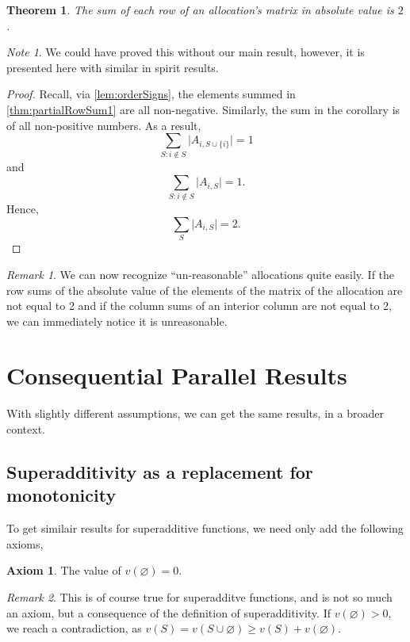 \documentclass[12pt,letterpaper,final]{article}
\theoremstyle{plain}
\newtheorem{theorem}{Theorem}[section]
\theoremstyle{plain}
\theoremstyle{plain}
\theoremstyle{plain}
\theoremstyle{plain}
\theoremstyle{plain}
\theoremstyle{plain}
\theoremstyle{definition}
\theoremstyle{definition}
\theoremstyle{definition}
\theoremstyle{definition}
\theoremstyle{definition}
\newtheorem{axiom}{Axiom}[section]
\theoremstyle{remark}
\newtheorem*{remark}{Remark}
\theoremstyle{remark}
\newtheorem*{note}{Note}
\theoremstyle{remark}
\theoremstyle{remark}
\begin{document}
\begin{theorem}
  The sum of each row of an allocation's matrix in absolute value is
  \(2\).
\end{theorem}

\begin{note}
  We could have proved this without our main result, however, it is
  presented here with similar in spirit results.
\end{note}

\begin{proof}
  Recall, via \cref{lem:orderSigns}, the elements summed in
  \cref{thm:partialRowSum1} are all non-negative. Similarly,
  the sum in the corollary is of all non-positive numbers. As a
  result,
  \[
    \sum_{S: i\notin S} \lvert A_{i,S \cup \{i\}} \rvert= 1
  \]
  and
  \[
    \sum_{S: i\notin S} \lvert A_{i,S} \rvert= 1.
  \]
  Hence,
  \[
    \sum_{S} \lvert A_{i,S}\rvert= 2.
  \]
\end{proof}

\begin{remark}
  We can now recognize ``un-reasonable'' allocations quite easily. If
  the row sums of the absolute value of the elements of the matrix
  of the allocation are not equal to 2 and if the column sums of an
  interior column
  are not equal to 2, we can immediately notice it is unreasonable.
\end{remark}

\section{Consequential Parallel Results}
\label{cha:cons-parall-results}

With slightly different assumptions, we can get the same results, in a
broader context.

\subsection{Superadditivity as a replacement for monotonicity}

To get similair results for superadditive functions, we need only add
the following axioms,

\begin{axiom}\label{ax:valueNothing}
  The value of \(v(\varnothing) = 0\). 
\end{axiom}

\begin{remark}
  This is of course true for superadditve functions, and is not so
  much an axiom, but a consequence of the definition of superadditivity.
  If \(v(\varnothing)>0\), we reach a contradiction, as
  \(v(S)=v(S\cup \varnothing) \geq v(S)+v(\varnothing)\).
\end{remark}
\end{document}
